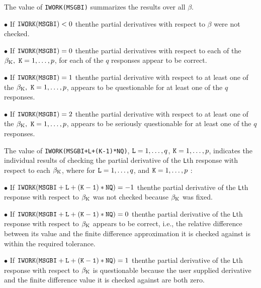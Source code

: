 {\parindent=1.35in 
\aligntobox The value of {\tt IWORK(MSGBI)} summarizes the results over all $\beta$.

\item{$\bullet$} If ${\tt IWORK(MSGBI)} < 0$ then\hfil\break the partial derivatives with respect to $\beta$ were not checked.

\item{$\bullet$} If ${\tt IWORK(MSGBI)} = 0$ then\hfil\break the partial derivatives with respect to each of the $\beta_{\rm K},\ {\tt K} = 1,\ldots,p$, for each of the $q$ responses appear to be correct.

\item{$\bullet$} If ${\tt IWORK(MSGBI)} = 1$ then\hfil\break the partial derivative with respect to at least one of the $\beta_{\rm K},\ {\tt K}=1,\ldots,p$, appears to be questionable for at least one of the $q$ responses.

\item{$\bullet$} If ${\tt IWORK(MSGBI)} = 2$ then\hfil\break the partial derivative with respect to at least one of the $\beta_{\rm K},\ {\tt K}=1,\ldots,p$, appears to be seriously questionable for at least one of the $q$ responses.

\aligntobox The value of {\tt IWORK(MSGBI+L+(K-1)*NQ)}, ${\tt L} = 1,\ldots,q$, ${\tt K} = 1,\ldots,p$, indicates the individual results of checking the partial derivative of the {\tt L}th response with respect to each $\beta_{\rm K}$, where for ${\tt L} = 1,\ldots,q$, and ${\tt K} = 1,\ldots,p$ :

\item{$\bullet$} If ${\tt IWORK(MSGBI+L+(K-1)*NQ)} = -1$ then\hfil\break the partial derivative of the {\tt L}th response with respect to $\beta_{\rm K}$ was not checked because $\beta_{\rm K}$ was fixed.

\item{$\bullet$} If ${\tt IWORK(MSGBI+L+(K-1)*NQ)} = 0$ then\hfil\break the partial derivative of the {\tt L}th response with respect to $\beta_{\rm K}$ appears to be correct, i.e., the relative difference between its value and the finite difference approximation it is checked against is within the required tolerance. 

\item{$\bullet$} If ${\tt IWORK(MSGBI+L+(K-1)*NQ)} = 1$ then\hfil\break the partial derivative of the {\tt L}th response with respect to $\beta_{\rm K}$ is questionable because the user supplied derivative and the finite difference value it is checked against are both zero.

}
